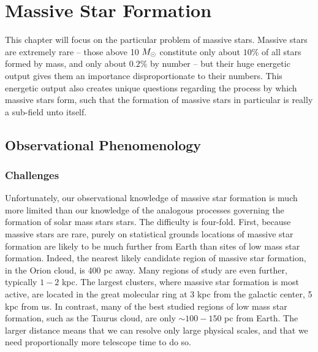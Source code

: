\chapter{Massive Star Formation}
\label{ch:massivestar}


This chapter will focus on the particular problem of massive stars. Massive stars are extremely rare -- those above 10 $M_{\odot}$ constitute only about $10\%$ of all stars formed by mass, and only about $0.2\%$ by number -- but their huge energetic output gives them an importance disproportionate to their numbers. This energetic output also creates unique questions regarding the process by which massive stars form, such that the formation of massive stars in particular is really a sub-field unto itself.

\section{Observational Phenomenology}

\subsection{Challenges}

Unfortunately, our observational knowledge of massive star formation is much more limited than our knowledge of the analogous processes governing the formation of solar mass stars stars. The difficulty is four-fold. First, because massive stars are rare, purely on statistical grounds locations of massive star formation are likely to be much further from Earth than sites of low mass star formation. Indeed, the nearest likely candidate region of massive star formation, in the Orion cloud, is 400 pc away. Many regions of study are even further, typically $1-2$ kpc. The largest clusters, where massive star formation is most active, are located in the great molecular ring at 3 kpc from the galactic center, 5 kpc from us. In contrast, many of the best studied regions of low mass star formation, such as the Taurus cloud, are only $\sim 100-150$ pc from Earth. The larger distance means that we can resolve only large physical scales, and that we need proportionally more telescope time to do so.

